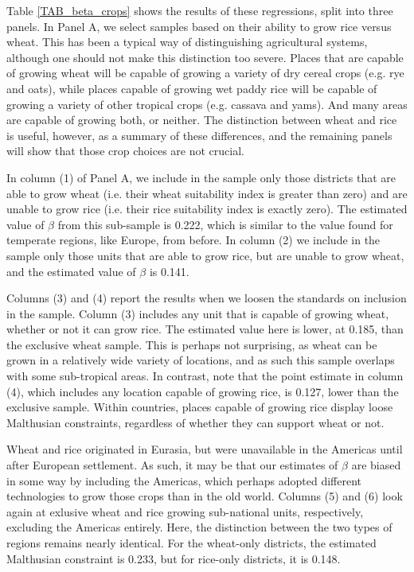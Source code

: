\documentclass[11pt]{article}
\begin{document}
Table \ref{TAB_beta_crops} shows the results of these regressions, split into three panels. In Panel A, we select samples based on their ability to grow rice versus wheat. This has been a typical way of distinguishing agricultural systems, although one should not make this distinction too severe. Places that are capable of growing wheat will be capable of growing a variety of dry cereal crops (e.g. rye and oats), while places capable of growing wet paddy rice will be capable of growing a variety of other tropical crops (e.g. cassava and yams). And many areas are capable of growing both, or neither. The distinction between wheat and rice is useful, however, as a summary of these differences, and the remaining panels will show that those crop choices are not crucial.

In column (1) of Panel A, we include in the sample only those districts that are able to grow wheat (i.e. their wheat suitability index is greater than zero) and are unable to grow rice (i.e. their rice suitability index is exactly zero). The estimated value of $\beta$ from this sub-sample is 0.222, which is similar to the value found for temperate regions, like Europe, from before. In column (2) we include in the sample only those units that are able to grow rice, but are unable to grow wheat, and the estimated value of $\beta$ is 0.141.

Columns (3) and (4) report the results when we loosen the standards on inclusion in the sample. Column (3) includes any unit that is capable of growing wheat, whether or not it can grow rice. The estimated value here is lower, at 0.185, than the exclusive wheat sample. This is perhaps not surprising, as wheat can be grown in a relatively wide variety of locations, and as such this sample overlaps with some sub-tropical areas. In contrast, note that the point estimate in column (4), which includes any location capable of growing rice, is 0.127, lower than the exclusive sample. Within countries, places capable of growing rice display loose Malthusian constraints, regardless of whether they can support wheat or not.

Wheat and rice originated in Eurasia, but were unavailable in the Americas until after European settlement. As such, it may be that our estimates of $\beta$ are biased in some way by including the Americas, which perhaps adopted different technologies to grow those crops than in the old world. Columns (5) and (6) look again at exlusive wheat and rice growing sub-national units, respectively, excluding the Americas entirely. Here, the distinction between the two types of regions remains nearly identical. For the wheat-only districts, the estimated Malthusian constraint is 0.233, but for rice-only districts, it is 0.148. 
\end{document}
